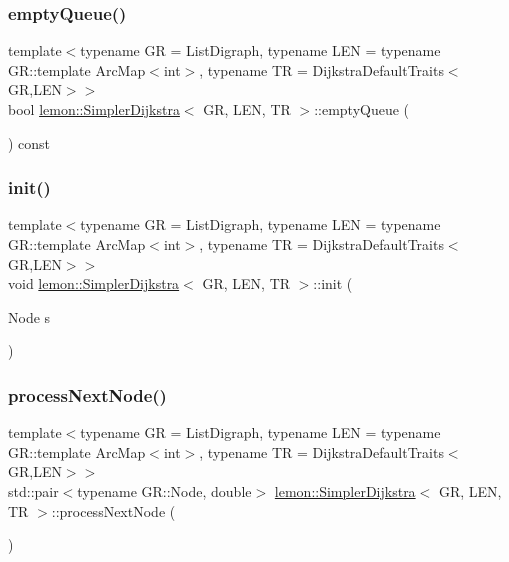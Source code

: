 \subsubsection{\texorpdfstring{empty\+Queue()}{emptyQueue()}}
{\footnotesize\ttfamily template$<$typename GR = List\+Digraph, typename L\+EN = typename G\+R\+::template Arc\+Map$<$int$>$, typename TR = Dijkstra\+Default\+Traits$<$\+G\+R,\+L\+E\+N$>$$>$ \\
bool \hyperlink{classlemon_1_1_simpler_dijkstra}{lemon\+::\+Simpler\+Dijkstra}$<$ GR, L\+EN, TR $>$\+::empty\+Queue (\begin{DoxyParamCaption}{ }\end{DoxyParamCaption}) const\hspace{0.3cm}{\ttfamily [inline]}}

\mbox{\label{classlemon_1_1_simpler_dijkstra_a714103f8b8c32f17211bdd0dae12fe4e}} 
\subsubsection{\texorpdfstring{init()}{init()}}
{\footnotesize\ttfamily template$<$typename GR = List\+Digraph, typename L\+EN = typename G\+R\+::template Arc\+Map$<$int$>$, typename TR = Dijkstra\+Default\+Traits$<$\+G\+R,\+L\+E\+N$>$$>$ \\
void \hyperlink{classlemon_1_1_simpler_dijkstra}{lemon\+::\+Simpler\+Dijkstra}$<$ GR, L\+EN, TR $>$\+::init (\begin{DoxyParamCaption}\item[{Node}]{s }\end{DoxyParamCaption})\hspace{0.3cm}{\ttfamily [inline]}}

\mbox{\label{classlemon_1_1_simpler_dijkstra_a84a7dcefca1d2a82a6af236dc082d77a}} 
\subsubsection{\texorpdfstring{process\+Next\+Node()}{processNextNode()}}
{\footnotesize\ttfamily template$<$typename GR = List\+Digraph, typename L\+EN = typename G\+R\+::template Arc\+Map$<$int$>$, typename TR = Dijkstra\+Default\+Traits$<$\+G\+R,\+L\+E\+N$>$$>$ \\
std\+::pair$<$typename G\+R\+::\+Node, double$>$ \hyperlink{classlemon_1_1_simpler_dijkstra}{lemon\+::\+Simpler\+Dijkstra}$<$ GR, L\+EN, TR $>$\+::process\+Next\+Node (\begin{DoxyParamCaption}{ }\end{DoxyParamCaption})\hspace{0.3cm}{\ttfamily [inline]}}



